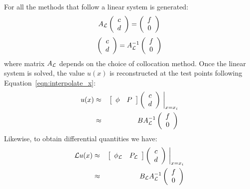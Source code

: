 \documentclass[11pt]{report}
\begin{document}
{%
For all the methods that follow a linear system is generated: 
$$
A_{\mathcal{L}}  \left( \begin{array}{cc}  c \\ d  \end{array} \right)  =  \left( \begin{array}{cc}  f \\ 0  \end{array} \right) 
$$
\begin{equation}
  \left( \begin{array}{cc}  c \\ d  \end{array} \right) = A^{-1}_{\mathcal{L}}  \left( \begin{array}{cc}  f \\ 0  \end{array} \right) \nonumber
 \end{equation}
 where matrix $A_{\mathcal{L}}$ depends on the choice of collocation method. 
Once the linear system is solved, the value $u(x)$ is reconstructed at the test points following Equation~\ref{eqn:interpolate_x}:
\begin{eqnarray}
u(x) & \approx &  \left.
\left[ \begin{array}{c c} 
       \phi &  P
	\end{array} \right]
	  \left( \begin{array}{cc}  c \\ d  \end{array} \right)  \ \right|_{x={x_i}} \nonumber\\
	 & \approx & B A^{-1}_{\mathcal{L}} \left( \begin{array}{cc}  f \\ 0  \end{array} \right) 
	\label{eqn:solve_u}
\end{eqnarray}
Likewise, to obtain differential quantities we have: 
\begin{eqnarray*}
\mathcal{L}u(x) & \approx & \left.
\left[ \begin{array}{c c} 
       \phi_{\mathcal{L}} &  P_{\mathcal{L}}
	\end{array} \right]
	  \left( \begin{array}{cc}  c \\ d  \end{array} \right)  \ \right|_{x={x_i}} \\
  	 & \approx & B_{\mathcal{L}} A^{-1}_{\mathcal{L}} \left( \begin{array}{cc}  f \\ 0  \end{array} \right)
	\label{eqn:solve_uxx}
\end{eqnarray*}

}
\end{document}
